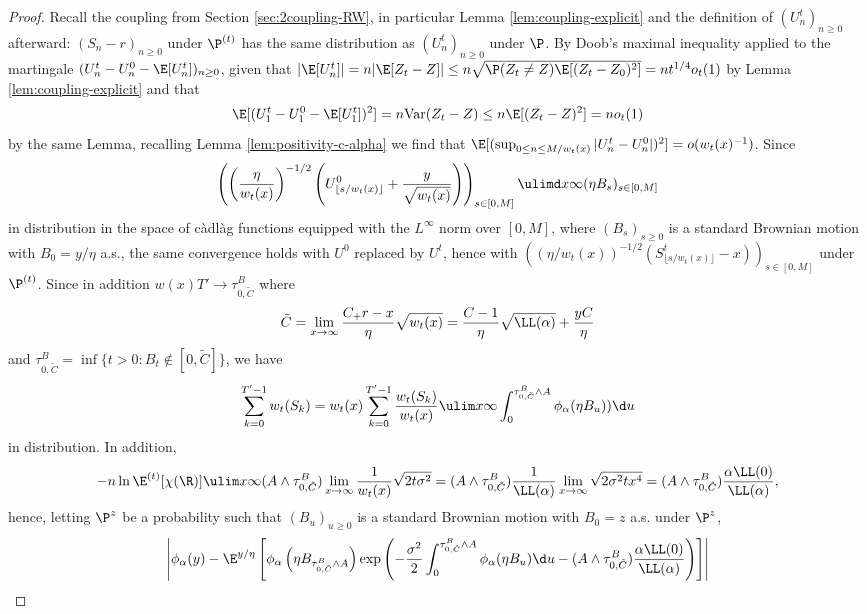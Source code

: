 \documentclass[10pt,a4paper]{article}
\begin{document}
\begin{proof}
Recall the coupling from Section \ref{sec:2coupling-RW}, in particular Lemma \ref{lem:coupling-explicit} and the definition of $(U^t_n)_{n\geq 0}$ afterward: $(S_n-r)_{n\geq 0}$ under $\P^{(t)}$ has the same distribution as $(U^t_n)_{n\geq 0}$ under $\P$. By Doob's maximal inequality applied to the martingale $(U^t_n - U^0_n - \E[U^t_n])_{n\geq 0}$, given that $|\E[U^t_n]| = n|\E[Z_t-Z]| \leq n \sqrt{\P(Z_t \neq Z) \E[(Z_t-Z_0)^2]} = n t^{1/4} o_t(1)$ by Lemma \ref{lem:coupling-explicit} and that 
\[ \E[(U_1^t - U_1^0 - \E[U_1^t])^2] = n\mathrm{Var}(Z_t-Z) \leq n \E[(Z_t-Z)^2] = n o_t(1) \]
by the same Lemma, recalling Lemma \ref{lem:positivity-c-alpha} we find that $\E[ (\sup_{0\leq n \leq M/w_t(x)} |U^t_n - U^0_n|)^2] = o(w_t(x)^{-1})$. Since 
\[ \left(\left(\frac{\eta}{w_t(x)}\right)^{-1/2} \left(U^0_{\lfloor s/w_t(x)\rfloor} + \frac{y}{\sqrt{w_t(x)}} \right)\right)_{s\in [0,M]} \ulimd x \infty (\eta B_s)_{s\in [0,M]} \]
in distribution in the space of càdlàg functions equipped with the $L^\infty$ norm over $[0,M]$, where $(B_s)_{s\geq 0}$ is a standard Brownian motion with $B_0 = y/\eta$ a.s., the same convergence holds with $U^0$ replaced by $U^t$, hence with $((\eta / w_t(x))^{-1/2}(S_{\lfloor s/w_t(x) \rfloor}^t-x))_{s\in [0, M]}$ under $\P^{(t)}$. 
%
%
Since in addition $w(x) T' \to \tau_{0,\tilde C}^B$ where 
\[ \tilde C = \lim_{x\to\infty} \frac{C_+ r - x}{\eta}\sqrt{w_t(x)} = \frac{C-1}{\eta} \sqrt{\LL(\alpha)} + \frac{y C}{\eta} \]
and $\tau_{0,\tilde C}^B = \inf\{t>0: B_t \notin [0,\tilde C]\}$, we have 
\[ \sum_{k=0}^{T'-1} w_t(S_k) = w_t(x) \sum_{k=0}^{T'-1} \frac{w_t(S_k)}{w_t(x)} \ulim x \infty \int_0^{\tau_{0,\tilde C}^B \wedge A} \phi_\alpha(\eta B_u)) \d u \]
in distribution.  
In addition, %
\[ - n \ln\E^{(t)}[\chi(\R)] \ulim x \infty (A\wedge \tau_{0,\tilde C}^B) \lim_{x\to\infty} \frac{1}{w_t(x)} \sqrt{2t\sigma^2} = (A\wedge \tau_{0,\tilde C}^B) \frac{1}{\LL(\alpha)} \lim_{x\to\infty} \sqrt{2\sigma^2 t x^4} = (A\wedge \tau_{0,\tilde C}^B) \frac{\alpha \LL(0)}{\LL(\alpha)} , \]
hence, letting $\P^z$ be a probability such that $(B_u)_{u\geq 0}$ is a standard Brownian motion with $B_0 = z$ a.s. under $\P^z$, 
\begin{multline*}
\left| \phi_\alpha(y) - \E^{y/\eta}\left[ \phi_\alpha\left( \eta B_{\tau^B_{0,\tilde C} \wedge A} \right) \exp\left( - \frac{\sigma^2}{2} \int_0^{\tau_{0,\tilde C}^B \wedge A} \phi_\alpha(\eta B_u) \d u - (A\wedge \tau_{0,\tilde C}^B) \frac{\alpha \LL(0)}{\LL(\alpha)} \right) \right] \right| \\

\end{multline*}
\end{proof}
\end{document}
